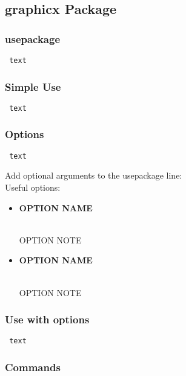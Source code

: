\documentclass[class=article , crop=false, titlepage, twoside, multi={itemize, figure, verbatim}, float=false]{standalone}
\title{}  %
\begin{document}

\ifstandalone
\maketitle %
\clearpage
\tableofcontents %
\clearpage
\fi

\clearpage

\subsection[graphicx Package]{\LARGE graphicx Package}

\subsubsection[usepackage]{\Large usepackage}
\begin{verbatim} text \end{verbatim}

\subsubsection[Simple Use]{\Large Simple Use}
\begin{verbatim} text \end{verbatim}

\subsubsection[Options]{\Large Options}
\begin{verbatim} text \end{verbatim}
Add optional arguments to the usepackage line:\\
Useful options:\begin{itemize}
\item \begin{large}\textbf{OPTION NAME}\end{large}\\OPTION NOTE
\item \begin{large}\textbf{OPTION NAME}\end{large}\\OPTION NOTE
\end{itemize}

\subsubsection[Use with Options]{\Large Use with options}
\begin{verbatim} text \end{verbatim}

\subsubsection[Commands]{\Large Commands}
\end{document}

